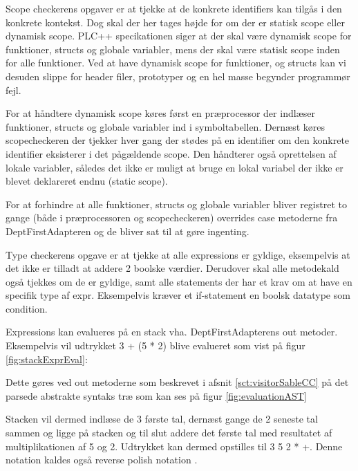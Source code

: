 Scope checkerens opgaver er at tjekke at de konkrete identifiers kan tilgås i den konkrete kontekst. Dog skal der her tages højde for om der er statisk scope eller dynamisk scope. PLC++ specikationen siger at der skal være dynamisk scope for funktioner, structs og globale variabler, mens der skal være statisk scope inden for alle funktioner. Ved at have dynamisk scope for funktioner, og structs kan vi desuden slippe for header filer, prototyper og en hel masse begynder programmør fejl.

For at håndtere dynamisk scope køres først en præprocessor der indlæser funktioner, structs og globale variabler ind i symboltabellen. Dernæst køres scopecheckeren der tjekker hver gang der stødes på en identifier om den konkrete identifier eksisterer i det pågældende scope. Den håndterer også oprettelsen af lokale variabler, således det ikke er muligt at bruge en lokal variabel der ikke er blevet deklareret endnu (static scope).

For at forhindre at alle funktioner, structs og globale variabler bliver registret to gange (både i præprocessoren og scopecheckeren) overrides case metoderne fra DeptFirstAdapteren og de bliver sat til at gøre ingenting.

Type checkerens opgave er at tjekke at alle expressions er gyldige, eksempelvis at det ikke er tilladt at addere 2 boolske værdier. Derudover skal alle metodekald også tjekkes om de er gyldige, samt alle statements der har et krav om at have en specifik type af expr. Eksempelvis kræver et if-statement en boolsk datatype som condition.

Expressions kan evalueres på en stack vha. DeptFirstAdapterens out metoder. Eksempelvis vil udtrykket 3 + (5 * 2) blive evalueret som vist på figur \ref{fig:stackExprEval}:


Dette gøres ved out metoderne som beskrevet i afsnit \ref{sct:visitorSableCC} på det parsede abstrakte syntaks træ som kan ses på figur \ref{fig:evaluationAST}

Stacken vil dermed indlæse de 3 første tal, dernæst gange de 2 seneste tal sammen og ligge på stacken og til slut addere det første tal med resultatet af multiplikationen af 5 og 2. Udtrykket kan dermed opstilles til 3 5 2 * +. Denne notation kaldes også reverse polish notation \cite{CraftingCompiler_2009}.

